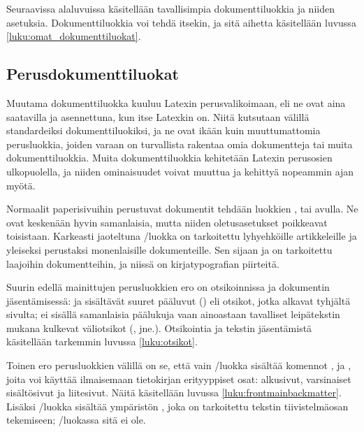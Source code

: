 Seuraavissa alaluvuissa käsitellään tavallisimpia dokumenttiluokkia ja
niiden asetuksia. Dokumenttiluokkia voi tehdä itsekin, ja sitä aihetta
käsitellään luvussa \ref{luku:omat_dokumenttiluokat}.

\subsection{Perusdokumenttiluokat}

Muutama dokumenttiluokka kuuluu Latexin perusvalikoimaan, eli ne ovat
aina saatavilla ja asennettuna, kun itse Latexkin on. Niitä kutsutaan
välillä standardeiksi dokumenttiluokiksi, ja ne ovat ikään kuin
muuttumattomia perusluokkia, joiden varaan on turvallista rakentaa omia
dokumentteja tai muita dokumenttiluokkia. Muita dokumenttiluokkia
kehitetään Latexin perusosien ulkopuolella, ja niiden ominaisuudet
voivat muuttua ja kehittyä nopeammin ajan myötä.

Normaalit paperisivuihin perustuvat dokumentit tehdään luokkien
,  tai  avulla.
   Ne ovat
keskenään hyvin samanlaisia, mutta niiden oletusasetukset poikkeavat
toisistaan. Karkeasti jaoteltuna \-/luokka on tarkoitettu
lyhyehköille artikkeleille ja yleiseksi perustaksi monenlaisille
dokumenteille. Sen sijaan  ja  on tarkoitettu
laajoihin dokumentteihin, ja niissä on kirja\-typo\-grafian piirteitä.

Suurin edellä mainittujen perusluokkien ero on otsikoinnissa ja
dokumentin jäsentämisessä:  ja 
sisältävät suuret pääluvut () eli otsikot, jotka
alkavat tyhjältä sivulta;  ei sisällä samanlaisia
päälukuja vaan ainoastaan tavalliset leipätekstin mukana kulkevat
väliotsikot (, 
jne.). Otsikointia ja tekstin jäsentämistä käsitellään tarkemmin luvussa
\ref{luku:otsikot}.

Toinen ero perusluokkien välillä on se, että vain \-/luokka
sisältää komennot ,  ja
, joita voi käyttää ilmaisemaan tietokirjan
erityyppiset osat: alkusivut, varsinaiset sisältösivut ja liitesivut.
Näitä käsitellään luvussa \ref{luku:frontmainbackmatter}. Lisäksi
\-/luokka sisältää ympäristön , joka on
tarkoitettu tekstin tiivis\-telmä\-osan tekemiseen;
\-/luokassa sitä ei ole.

